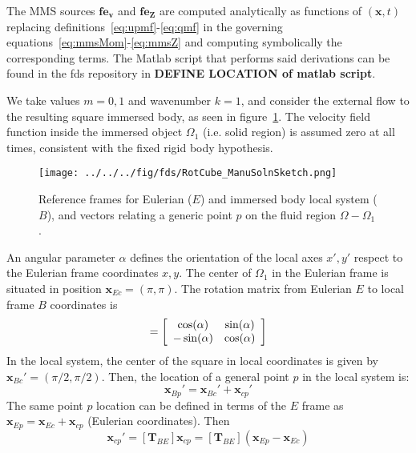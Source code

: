 \documentclass[12pt]{article}
\begin{document}
 The MMS sources $\mathbf{fe_v}$ and $\mathbf{fe_Z}$ are computed analytically as functions of $(\mathbf{x},t)$ replacing definitions~\eqref{eq:upmf}-\eqref{eq:qmf} in the governing equations~\eqref{eq:mmsMom}-\eqref{eq:mmsZ} and computing symbolically the corresponding terms. The Matlab script that performs said derivations can be found in the fds repository in \textbf{DEFINE LOCATION of matlab script}.



We take values $m=0,1$ and wavenumber $k=1$, and consider the external flow to the resulting square immersed body, as seen in figure~\ref{Fig:ManuSoln}. The velocity field function inside the immersed object $\Omega_1$ (i.e. solid region) is assumed zero at all times, consistent with the fixed rigid body hypothesis.
%
\begin{figure}[h]
      \centering
      \texttt{[image: ../../../fig/fds/RotCube\_ManuSolnSketch.png]}
      \caption{Reference frames for Eulerian ($E$) and immersed body local system ($B$), and vectors relating a generic point $p$ on the fluid region $\Omega-\Omega_1$.}
	\label{Fig:ManuSoln}
\end{figure}
%
An angular parameter $\alpha$ defines the orientation of the local axes $x',y'$ respect to the Eulerian frame coordinates $x,y$. The center of $\Omega_1$ in the Eulerian frame is situated in position $\mathbf{x}_{Ec}=(\pi,\pi)$. The rotation matrix from Eulerian $E$ to local frame $B$ coordinates is
%
\begin{equation}
  [\mathbf{T}_{BE}] = \left[ \begin{array}{c c}
                                          \cos(\alpha) & \sin(\alpha) \\
                                         -\sin(\alpha)  & \cos(\alpha) \end{array} \right]
\end{equation}
%
In the local system, the center of the square in local coordinates is given by $\mathbf{x}_{Bc}'=(\pi/2,\pi/2)$. Then, the location of a general point $p$ in the local system is:
%
\begin{equation}
    \mathbf{x}_{Bp}'= \mathbf{x}_{Bc}' +\mathbf{x}_{cp}'
\end{equation}
%
The same point $p$ location can be defined in terms of the $E$ frame as $\mathbf{x}_{Ep}= \mathbf{x}_{Ec} +\mathbf{x}_{cp}$ (Eulerian coordinates). Then
%
\begin{equation}
    \mathbf{x}_{cp}'=[\mathbf{T}_{BE}] \mathbf{x}_{cp}=[\mathbf{T}_{BE}] \left( \mathbf{x}_{Ep} - \mathbf{x}_{Ec} \right)
\end{equation}
\end{document}
